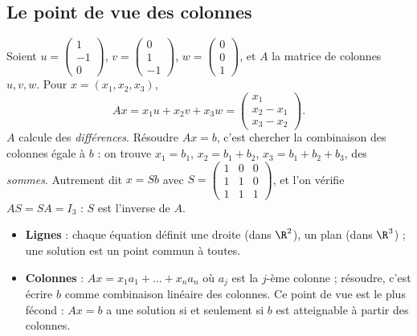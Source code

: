 \subsection{Le point de vue des colonnes}
\begin{exemple}\label{ex-differences}
Soient $u=\begin{pmatrix}1\\-1\\0\end{pmatrix}$, $v=\begin{pmatrix}0\\1\\-1\end{pmatrix}$, $w=\begin{pmatrix}0\\0\\1\end{pmatrix}$, et $A$ la matrice de colonnes $u,v,w$. Pour $x=(x_1,x_2,x_3)$,
\[Ax=x_1u+x_2v+x_3w=\begin{pmatrix}x_1\\x_2-x_1\\x_3-x_2\end{pmatrix}.\]
$A$ calcule des \emph{différences}. Résoudre $Ax=b$, c'est chercher la combinaison des colonnes égale à $b$ : on trouve $x_1=b_1$, $x_2=b_1+b_2$, $x_3=b_1+b_2+b_3$, des \emph{sommes}. Autrement dit $x=Sb$ avec $S=\begin{pmatrix}1&0&0\\1&1&0\\1&1&1\end{pmatrix}$, et l'on vérifie $AS=SA=I_3$ : $S$ est l'inverse de $A$.
\end{exemple}
\begin{essentiel}[Deux lectures de $Ax=b$]
\begin{itemize}
\item \textbf{Lignes} : chaque équation définit une droite (dans $\R^2$), un plan (dans $\R^3$) ; une solution est un point commun à toutes.
\item \textbf{Colonnes} : $Ax=x_1a_1+\dots+x_na_n$ où $a_j$ est la $j$-ème colonne ; résoudre, c'est écrire $b$ comme combinaison linéaire des colonnes. Ce point de vue est le plus fécond : $Ax=b$ a une solution si et seulement si $b$ est atteignable à partir des colonnes.
\end{itemize}
\end{essentiel}

